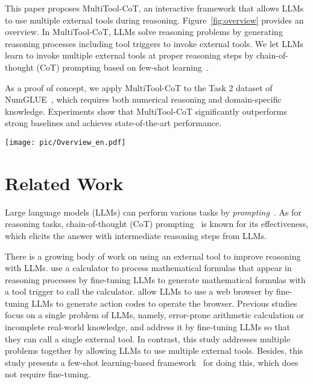 This paper proposes MultiTool-CoT, an interactive framework that allows LLMs to use multiple external tools during reasoning.
Figure~\ref{fig:overview} provides an overview.
In MultiTool-CoT, LLMs solve reasoning problems by generating reasoning processes including tool triggers to invoke external tools.
We let LLMs learn to invoke multiple external tools at proper reasoning steps by chain-of-thought (CoT) prompting based on few-shot learning~\cite{wei2022chain}.

As a proof of concept, we apply MultiTool-CoT to the Task 2 dataset of NumGLUE~\cite{mishra-etal-2022-numglue}, which requires both numerical reasoning and domain-specific knowledge.
Experiments show that MultiTool-CoT significantly outperforms strong baselines and achieves state-of-the-art performance.

\begin{figure*}[t]
    \centering
    \texttt{[image: pic/Overview\_en.pdf]}
    \caption{
        Overview of the MultiTool-CoT.
        The output of GPT-3, the calculator, the chemical reaction predictor, and the molar mass list are highlighted in green, yellow, orange, and purple, respectively.
    }
    \label{fig:overview}
\end{figure*}

\section{Related Work}
Large language models (LLMs) can perform various tasks by \textit{prompting}~\cite{10.1145/3560815}.
As for reasoning tasks, chain-of-thought (CoT) prompting~\cite{wei2022chain,kojima2022large} is known for its effectiveness, which elicits the answer with intermediate reasoning steps from LLMs.

There is a growing body of work on using an external tool to improve reasoning with LLMs.
\citet{dentaku} use a calculator to process mathematical formulas that appear in reasoning processes by fine-tuning LLMs to generate mathematical formulas with a tool trigger to call the calculator.
\citet{2021-nakano-webgpt} allow LLMs to use a web browser by fine-tuning LLMs to generate action codes to operate the browser.
Previous studies focus on a single problem of LLMs, namely, error-prone arithmetic calculation or incomplete real-world knowledge, and address it by fine-tuning LLMs so that they can call a single external tool.
In contrast, this study addresses multiple problems together by allowing LLMs to use multiple external tools.
Besides, this study presents a few-shot learning-based framework~\cite{GPT-3} for doing this, which does not require fine-tuning.


